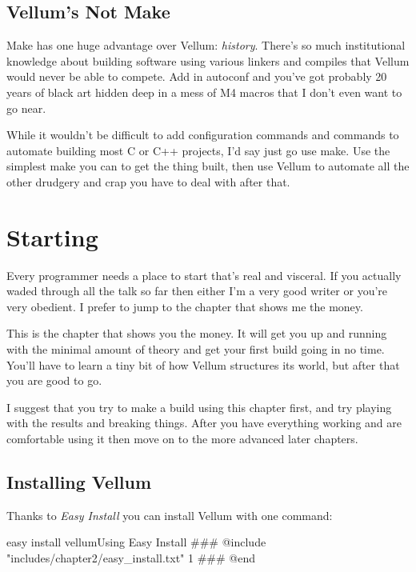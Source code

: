 \section{Vellum's Not Make}

Make has one huge advantage over Vellum:  \emph{history}.  There's so much
institutional knowledge about building software using various linkers and
compiles that Vellum would never be able to compete.  Add in autoconf and you've
got probably 20 years of black art hidden deep in a mess of M4 macros that I
don't even want to go near.

While it wouldn't be difficult to add configuration commands and commands to
automate building most C or C++ projects, I'd say just go use make.  Use the
simplest make you can to get the thing built, then use Vellum to automate all
the other drudgery and crap you have to deal with after that.



\chapter{Starting}
\label{chapter:Starting}

Every programmer needs a place to start that's real and visceral.  If you
actually waded through all the talk so far then either I'm a very good writer or
you're very obedient.  I prefer to jump to the chapter that shows me the money.

This is the chapter that shows you the money.  It will get you up and running
with the minimal amount of theory and get your first build going in no time.
You'll have to learn a tiny bit of how Vellum structures its world, but after
that you are good to go.

I suggest that you try to make a build using this chapter first, and try playing
with the results and breaking things.  After you have everything working and are
comfortable using it then move on to the more advanced later chapters.



\section{Installing Vellum}

Thanks to \emph{Easy Install} you can install Vellum with one command:

\begin{code}{easy install vellum}{Using Easy Install}
### @include "includes/chapter2/easy_install.txt" 1
### @end
\end{code}

